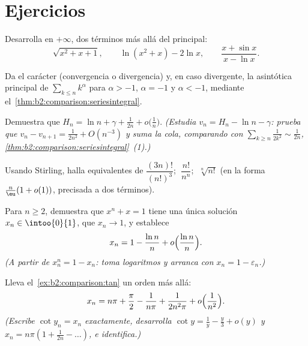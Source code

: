 \section{Ejercicios}

\begin{exercise}[$\star$]\label{exo:b2:comparison:1}
Desarrolla en $+\infty$, dos términos más allá del principal:
\[
\sqrt{x^2 + x + 1} ,
\qquad
\ln(x^2 + x) - 2\ln x,
\qquad
\frac{x + \sin x}{x - \ln x} .
\]
\end{exercise}

\begin{exercise}[$\star$]\label{exo:b2:comparison:2}
Da el carácter (convergencia o divergencia) y, en caso divergente,
la asintótica principal de $\sum_{k \leq n} k^\alpha$ para $\alpha >
-1$, $\alpha = -1$ y $\alpha < -1$, mediante el~\cref{thm:b2:comparison:seriesintegral}.
\end{exercise}

\begin{exercise}[$\star\star$]\label{exo:b2:comparison:3}
Demuestra que $H_n = \ln n + \gamma + \frac{1}{2n} +
o\bigl(\frac1n\bigr)$. \emph{(Estudia $v_n = H_n - \ln n - \gamma$:
prueba que $v_n - v_{n+1} = \frac{1}{2n^2} + O(n^{-3})$ y suma la
cola, comparando con $\sum_{k \geq n} \frac{1}{2k^2} \sim
\frac{1}{2n}$, \cref{thm:b2:comparison:seriesintegral}~(1).)}
\end{exercise}

\begin{exercise}[$\star\star$]\label{exo:b2:comparison:4}
Usando Stirling, halla equivalentes de $\dfrac{(3n)!}{(n!)^3}$;
$\;\dfrac{n!}{n^n}$; $\;\sqrt[n]{n!}$ (en la forma $\frac
n\eu(1 + o(1))$, precisada a dos términos).
\end{exercise}

\begin{exercise}[$\star\star$]\label{exo:b2:comparison:5}
Para $n \geq 2$, demuestra que $x^n + x = 1$ tiene una única
solución $x_n \in \intoo{0}{1}$, que $x_n \to 1$, y establece
\[
x_n = 1 - \frac{\ln n}{n} + o\Bigl(\frac{\ln n}{n}\Bigr).
\]
\emph{(A partir de $x_n^n = 1 - x_n$: toma logaritmos y arranca con
$x_n = 1 - \varepsilon_n$.)}
\end{exercise}

\begin{exercise}[$\star\star$]\label{exo:b2:comparison:6}
Lleva el~\cref{ex:b2:comparison:tan} un orden más allá:
\[
x_n = n\pi + \frac\pi2 - \frac{1}{n\pi} + \frac{1}{2n^2\pi} +
o\Bigl(\frac{1}{n^2}\Bigr).
\]
\emph{(Escribe $\cot y_n = x_n$ exactamente, desarrolla $\cot y =
\frac1y - \frac y3 + o(y)$ y $x_n = n\pi(1 + \frac{1}{2n} -
\dots)$, e identifica.)}
\end{exercise}

